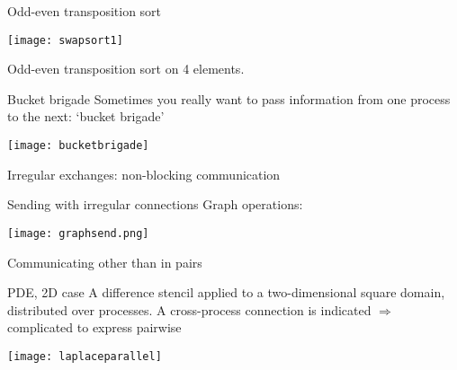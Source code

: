 \begin{numberedframe}{Odd-even transposition sort}
  \label{fig:swapsort1}

  \texttt{[image: swapsort1]}

  Odd-even transposition sort on 4 elements.
\end{numberedframe}

\begin{optexerciseframe}
  \footnotesize
  
\end{optexerciseframe}

\begin{numberedframe}{Bucket brigade}
  Sometimes you really want to pass information from one process to
  the next: `bucket brigade'

  \texttt{[image: bucketbrigade]}
\end{numberedframe}

\begin{exerciseframe}[bucketblock]
  
\end{exerciseframe}

  {Irregular exchanges: non-blocking communication}

\begin{numberedframe}{Sending with irregular connections}
  Graph operations:
  
  \texttt{[image: graphsend.png]}
\end{numberedframe}

 {Communicating other than in pairs}
  
\begin{numberedframe}{PDE, 2D case}
    A difference stencil applied to a two-dimensional square
    domain, distributed over processes. A cross-process connection
    is indicated $\Rightarrow$ complicated to express pairwise

    \texttt{[image: laplaceparallel]}
\end{numberedframe}

